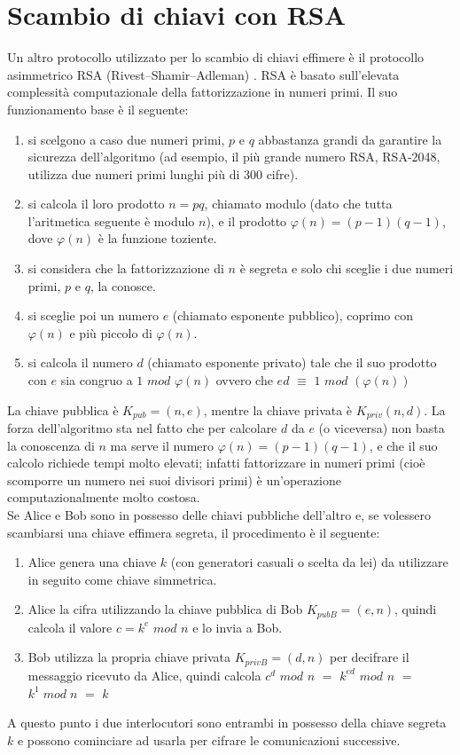 \section{Scambio di chiavi con RSA}
Un altro protocollo utilizzato per lo scambio di chiavi effimere è il protocollo asimmetrico RSA (Rivest–Shamir–Adleman) \cite{noauthor_rsa_2022}. RSA è basato sull'elevata complessità computazionale della fattorizzazione in numeri primi. Il suo funzionamento base è il seguente:
\begin{enumerate}
    \item si scelgono a caso due numeri primi, $p$ e $q$ abbastanza grandi da garantire la sicurezza dell'algoritmo (ad esempio, il più grande numero RSA, RSA-2048, utilizza due numeri primi lunghi più di 300 cifre).
    \item si calcola il loro prodotto $n = pq$, chiamato modulo (dato che tutta l'aritmetica seguente è modulo $n$), e il prodotto $\varphi(n)=(p-1)(q-1)$, dove
    $\varphi(n)$ è la funzione toziente.
    \item si considera che la fattorizzazione di $n$ è segreta e solo chi sceglie i due numeri primi, $p$ e $q$, la conosce.
    \item si sceglie poi un numero $e$ (chiamato esponente pubblico), coprimo con $\varphi(n)$ e più piccolo di $\varphi(n)$.
    \item si calcola il numero $d$ (chiamato esponente privato) tale che il suo prodotto con $e$ sia congruo a $1$ $mod$ $\varphi(n)$ ovvero che $ed$ $\equiv$ $1$ $mod$ $(\varphi (n))$
\end{enumerate}
La chiave pubblica è $K_{pub} = (n,e)$, mentre la chiave privata è $K_{priv}(n,d)$.
La forza dell'algoritmo sta nel fatto che per calcolare $d$ da $e$ (o viceversa) non basta la conoscenza di $n$ ma serve il numero $\varphi(n)=(p-1)(q-1)$, e che il suo calcolo richiede tempi molto elevati; infatti fattorizzare in numeri primi (cioè scomporre un numero nei suoi divisori primi) è un'operazione computazionalmente molto costosa.\\
Se Alice e Bob sono in possesso delle chiavi pubbliche dell'altro e, se volessero scambiarsi una chiave effimera segreta, il procedimento è il seguente:
\begin{enumerate}
    \item Alice genera una chiave $k$ (con generatori casuali o scelta da lei) da utilizzare in seguito come chiave simmetrica.
    \item Alice la cifra utilizzando la chiave pubblica di Bob $K_{pubB}= (e,n)$, quindi calcola il valore $c = k^e$ $mod$ $n$ e lo invia a Bob.
    \item Bob utilizza la propria chiave privata $K_{privB}= (d,n)$ per decifrare il messaggio ricevuto da Alice, quindi calcola $c^d$ $mod$ $n$ $=$ $k^{ed}$ $mod$ $n$ $=$ $k^1\;mod\;n$ $=$ $k$
\end{enumerate}
A questo punto i due interlocutori sono entrambi in possesso della chiave segreta $k$ e possono cominciare ad usarla per cifrare le comunicazioni successive.

